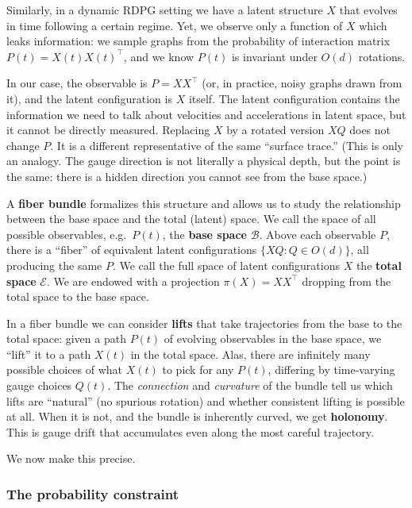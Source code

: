 \documentclass{article}
\theoremstyle{plain}
\theoremstyle{definition}
\theoremstyle{remark}
\begin{document}
Similarly, in a dynamic RDPG setting we have a latent structure $X$ that evolves in time following a certain regime. Yet, we observe only a function of $X$ which leaks information: we sample graphs from the probability of interaction matrix $P(t) = X(t) X(t)^\top$, and we know $P(t)$ is invariant under $O(d)$ rotations.


In our case, the observable is $P = XX^\top$ (or, in practice, noisy graphs drawn from it), and the latent configuration is $X$ itself.
The latent configuration contains the information we need to talk about velocities and accelerations in latent space, but it cannot be directly measured.
Replacing $X$ by a rotated version $XQ$ does not change $P$. It is a different representative of the same ``surface trace.'' (This is only an analogy. The gauge direction is not literally a physical depth, but the point is the same: there is a hidden direction you cannot see from the base space.)

A \textbf{fiber bundle} formalizes this structure and allows us to study the relationship between the base space and the total (latent) space.
We call the space of all possible observables, e.g.\ $P(t)$, the \textbf{base space} $\mathcal{B}$.
Above each observable $P$, there is a ``fiber'' of equivalent latent configurations $\{XQ : Q \in O(d)\}$, all producing the same $P$.
We call the full space of latent configurations $X$ the \textbf{total space} $\mathcal{E}$. We are endowed with a projection $\pi(X) = XX^\top$ dropping from the total space to the base space.

In a fiber bundle we can consider \textbf{lifts} that take trajectories from the base to the total space: given a path $P(t)$ of evolving observables in the base space, we ``lift'' it to a path $X(t)$ in the total space.
Alas, there are infinitely many possible choices of what $X(t)$ to pick for any $P(t)$, differing by time-varying gauge choices $Q(t)$.
The \emph{connection} and \emph{curvature} of the bundle tell us which lifts are ``natural'' (no spurious rotation) and whether consistent lifting is possible at all.
When it is not, and the bundle is inherently curved, we get \textbf{holonomy}. This is gauge drift that accumulates even along the most careful trajectory.

We now make this precise.

\subsubsection{The probability constraint}
\end{document}

